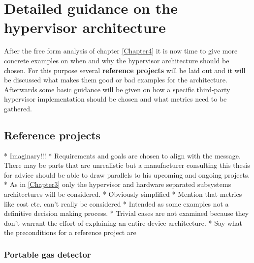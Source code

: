
\chapter{Detailed guidance on the hypervisor architecture} %

\label{Chapter5} %


\newcommand{\keyword}[1]{\textbf{#1}}
\newcommand{\tabhead}[1]{\textbf{#1}}
\newcommand{\code}[1]{\texttt{#1}}
\newcommand{\file}[1]{\texttt{\bfseries#1}}
\newcommand{\option}[1]{\texttt{\itshape#1}}

After the free form analysis of chapter \ref{Chapter4} it is now time to give more concrete examples on when and why the hypervisor architecture should be chosen. For this purpose several \keyword{reference projects} will be laid out and it will be discussed what makes them good or bad examples for the architecture. Afterwards some basic guidance will be given on how a specific third-party hypervisor implementation should be chosen and what metrics need to be gathered.
\section{Reference projects}
* Imaginary!!!
* Requirements and goals are chosen to align with the message. There may be parts that are unrealistic but a manufacturer consulting this thesis for advice should be able to draw parallels to his upcoming and ongoing projects. 
*  As in \ref{Chapter3} only the hypervisor and hardware separated subsystems architectures will be considered. 
* Obviously simplified
* Mention that metrics like cost etc. can't really be considered
* Intended as some examples not a definitive decision making process.
* Trivial cases are not examined because they don't warrant the effort of explaining an entire device architecture.
* Say what the preconditions for a reference project are
\subsection{Portable gas detector}
